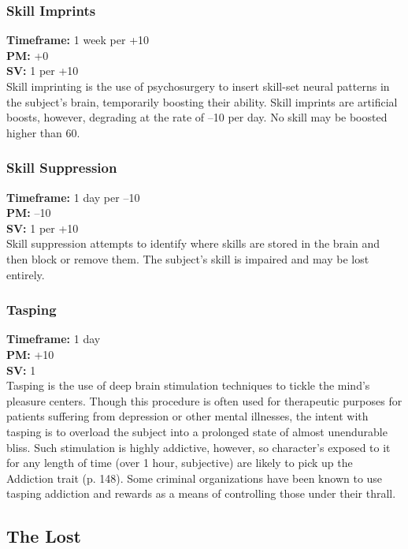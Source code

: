 \subsubsection{Skill Imprints} \textbf{Timeframe:} 1 week per +10 \\ \textbf{PM:} +0 \\ \textbf{SV:} 1 per +10 \\ Skill imprinting is the use of psychosurgery to insert skill-set neural patterns in the subject’s brain, temporarily boosting their ability. Skill imprints are artificial boosts, however, degrading at the rate of –10 per day. No skill may be boosted higher than 60. 

\subsubsection{Skill Suppression} \textbf{Timeframe:} 1 day per –10 \\ \textbf{PM:} –10 \\ \textbf{SV:} 1 per +10 \\ Skill suppression attempts to identify where skills are stored in the brain and then block or remove them. The subject’s skill is impaired and may be lost entirely. 

\subsubsection{Tasping} \textbf{Timeframe:} 1 day \\ \textbf{PM:} +10 \\ \textbf{SV:} 1 \\ Tasping is the use of deep brain stimulation techniques to tickle the mind’s pleasure centers. Though this procedure is often used for therapeutic purposes for patients suffering from depression or other mental illnesses, the intent with tasping is to overload the subject into a prolonged state of almost unendurable bliss. Such stimulation is highly addictive, however, so character’s exposed to it for any length of time (over 1 hour, subjective) are likely to pick up the Addiction trait (p. 148). Some criminal organizations have been known to use tasping addiction and rewards as a means of controlling those under their thrall. 



\subsection{The Lost} 

